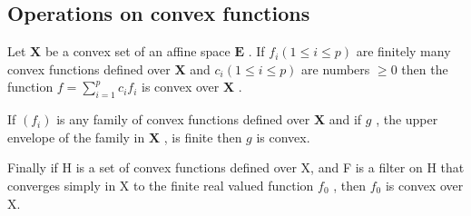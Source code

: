 \subsection{Operations on convex functions}

Let \(\mathbf{X}\) be a convex set of an affine space \(\mathbf{E}\) . If \(f_{i}(1 \leqslant i \leqslant p)\) are finitely many convex functions defined over \(\mathbf{X}\) and \(c_{i} (1 \leqslant i \leqslant p)\) are numbers \(\geqslant 0\) then the function \(f = \sum_{i=1}^{p} c_{i} f_{i}\) is convex over \(\mathbf{X}\) .

If \((f_{i})\) is any family of convex functions defined over \(\mathbf{X}\) and if \(g\) , the upper envelope of the family in \(\mathbf{X}\) , is finite then \(g\) is convex.

Finally if H is a set of convex functions defined over X, and F is a filter on H that converges simply in X to the finite real valued function \(f_{0}\) , then \(f_{0}\) is convex over X.

